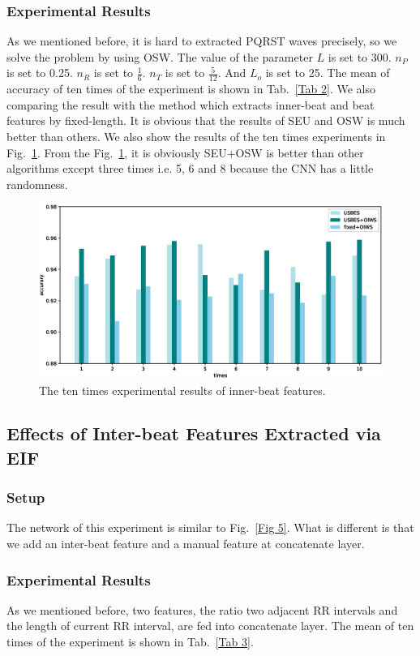\documentclass[wcp]{jmlr}
\begin{document}
\subsubsection{Experimental Results}
As we mentioned before, it is hard to extracted PQRST waves precisely, so we solve the problem by using OSW. The value of the parameter $L$ is set to 300. $n_P$ is set to 0.25. $n_R$ is set to $\frac{1}{6}$. $n_T$ is set to $\frac{5}{12}$. And $L_o$ is set to 25. The mean of accuracy of ten times of the experiment is shown in Tab.~\ref{Tab 2}. We also comparing the result with the method which extracts inner-beat and beat features by fixed-length. It is obvious that the results of SEU and OSW is much better than others. We also show the results of the ten times experiments in Fig.~\ref{Fig 8}. From the Fig.~\ref{Fig 8}, it is obviously SEU+OSW is better than other algorithms except three times i.e. 5, 6 and 8 because the CNN has a little randomness. 
\noindent
\begin{figure}
\centering
\includegraphics[scale=0.5]{inner-beat.eps}
\caption{The ten times experimental results of inner-beat features.}
\label{Fig 8}
\centering
\end{figure}
\subsection{Effects of Inter-beat Features Extracted via EIF}
\subsubsection{Setup}
The network of this experiment is similar to Fig.~\ref{Fig 5}. What is different is that we add an inter-beat feature and a manual feature at concatenate layer.
\subsubsection{Experimental Results}
As we mentioned before, two features, the ratio two adjacent RR intervals and the length of current RR interval, are fed into concatenate layer. The mean of ten times of the experiment is shown in Tab.~\ref{Tab 3}.
\end{document}
